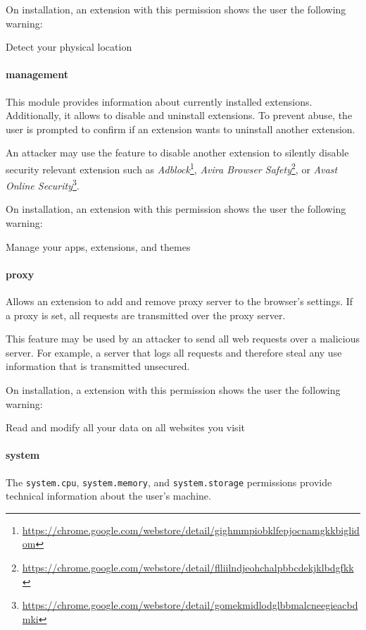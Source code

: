 	On installation, an extension with this permission shows the user the following warning:
	\begin{permissionwarning}
		Detect your physical location 
	\end{permissionwarning}
	
\paragraph{management}
	This module provides information about currently installed extensions. Additionally, it allows to disable and uninstall extensions. To prevent abuse, the user is prompted to confirm if an extension wants to uninstall another extension. 
	
	An attacker may use the feature to disable another extension to silently disable security relevant extension such as 
	\textit{Adblock}\footnote{\url{https://chrome.google.com/webstore/detail/gighmmpiobklfepjocnamgkkbiglidom}}, 
	\textit{Avira Browser Safety}\footnote{\url{https://chrome.google.com/webstore/detail/flliilndjeohchalpbbcdekjklbdgfkk}}, or 
	\textit{Avast Online Security}\footnote{\url{https://chrome.google.com/webstore/detail/gomekmidlodglbbmalcneegieacbdmki}}.
	
	On installation, an extension with this permission shows the user the following warning:
	\begin{permissionwarning}
		Manage your apps, extensions, and themes 
	\end{permissionwarning}
	
\paragraph{proxy}
	Allows an extension to add and remove proxy server to the browser's settings. If a proxy is set, all requests are transmitted over the proxy server.
	
	This feature may be used by an attacker to send all web requests over a malicious server. For example, a server that logs all requests and therefore steal any use information that is transmitted unsecured.
	
	On installation, a extension with this permission shows the user the following warning:
	\begin{permissionwarning}
		Read and modify all your data on all websites you visit 
	\end{permissionwarning}
	
\paragraph{system}
	The \texttt{system.cpu}, \texttt{system.memory}, and \texttt{system.storage} permissions provide technical information about the user's machine.
	
